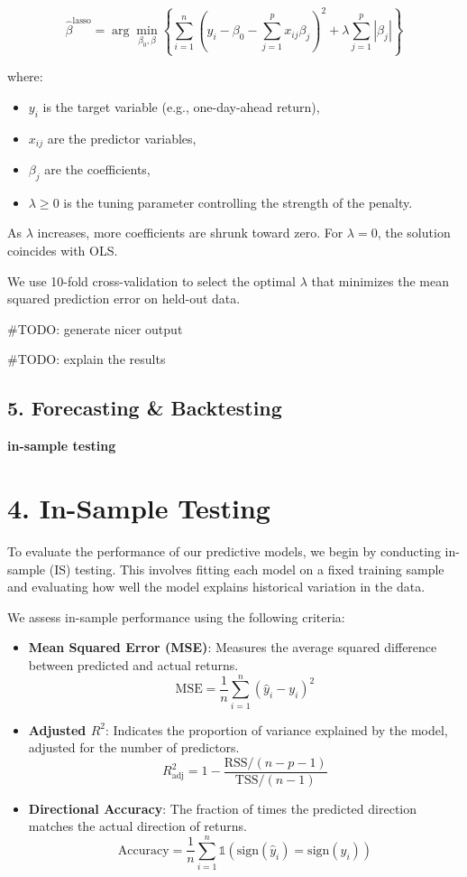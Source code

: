 \documentclass[
  12pt,
]{article}
\begin{document}
\[
\hat{\beta}^{\text{lasso}} = \arg \min_{\beta_0, \beta} \left\{ \sum_{i=1}^{n} \left( y_i - \beta_0 - \sum_{j=1}^{p} x_{ij} \beta_j \right)^2 + \lambda \sum_{j=1}^{p} |\beta_j| \right\}
\]

where:

\begin{itemize}
  \item \( y_i \) is the target variable (e.g., one-day-ahead return),
  \item \( x_{ij} \) are the predictor variables,
  \item \( \beta_j \) are the coefficients,
  \item \( \lambda \geq 0 \) is the tuning parameter controlling the strength of the penalty.
\end{itemize}

As \(\lambda\) increases, more coefficients are shrunk toward zero. For
\(\lambda = 0\), the solution coincides with OLS.

We use 10-fold cross-validation to select the optimal \(\lambda\) that
minimizes the mean squared prediction error on held-out data.

\#TODO: generate nicer output

\#TODO: explain the results

\subsection{5. Forecasting \&
Backtesting}\label{forecasting-backtesting}

\textbf{in-sample testing}

\section*{4. In-Sample Testing}

To evaluate the performance of our predictive models, we begin by
conducting in-sample (IS) testing. This involves fitting each model on a
fixed training sample and evaluating how well the model explains
historical variation in the data.

We assess in-sample performance using the following criteria:

\begin{itemize}
  \item \textbf{Mean Squared Error (MSE)}: Measures the average squared difference between predicted and actual returns.
  \[
  \text{MSE} = \frac{1}{n} \sum_{i=1}^{n} (\hat{y}_i - y_i)^2
  \]
  
  \item \textbf{Adjusted \( R^2 \)}: Indicates the proportion of variance explained by the model, adjusted for the number of predictors.
  \[
  R_{\text{adj}}^2 = 1 - \frac{\text{RSS}/(n - p - 1)}{\text{TSS}/(n - 1)}
  \]

  \item \textbf{Directional Accuracy}: The fraction of times the predicted direction matches the actual direction of returns.
  \[
  \text{Accuracy} = \frac{1}{n} \sum_{i=1}^{n} \mathbb{1} \left( \text{sign}(\hat{y}_i) = \text{sign}(y_i) \right)
  \]
\end{itemize}
\end{document}
